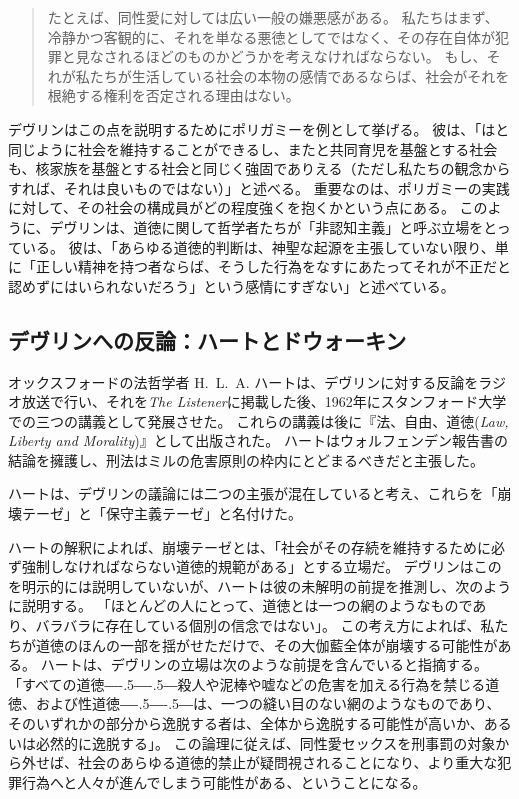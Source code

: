 \documentclass[paper=a4,book,openany]{jlreq}
\newcommand{\ig}[1]{}           %
\def\DDASH{―\kern-.5\zw―\kern-.5\zw―}
\begin{document}
\begin{quote}
たとえば、同性愛に対しては広い一般の嫌悪感がある。
私たちはまず、冷静かつ客観的に、それを単なる悪徳としてではなく、その存在自体が犯罪と見なされるほどのものかどうかを考えなければならない。
もし、それが私たちが生活している社会の本物の感情であるならば、社会がそれを根絶する権利を否定される理由はない\citep[p.40]{devlin65:_enfor_moral}。
\end{quote}

デヴリン\ig{Patrick Devlin}はこの点を説明するためにポリガミーを例として挙げる。
彼は、「はと同じように社会を維持することができるし、またと共同育児を基盤とする社会も、核家族を基盤とする社会と同じく強固でありえる（ただし私たちの観念からすれば、それは良いものではない）」と述べる\citep[p.114]{devlin65:_enfor_moral}。
重要なのは、ポリガミーの実践に対して、その社会の構成員がどの程度強くを抱くかという点にある。
このように、デヴリン\ig{Patrick Devlin}は、道徳に関して哲学者たちが「非認知主義」と呼ぶ立場をとっている。
彼は、「あらゆる道徳的判断は、神聖な起源を主張していない限り、単に「正しい精神を持つ者ならば、そうした行為をなすにあたってそれが不正だと認めずにはいられないだろう」という感情にすぎない」と述べている\citep[p.17]{devlin65:_enfor_moral}。

\subsection{デヴリンへの反論：ハートとドウォーキン}

オックスフォードの法哲学者 H.~L.~A. ハートは、デヴリン\ig{Patrick Devlin}に対する反論をラジオ放送で行い、それを\emph{The Listener}に掲載した後、1962年にスタンフォード大学での三つの講義として発展させた。
これらの講義は後に『法、自由、道徳(\emph{Law, Liberty and Morality})』として出版された。
ハートはウォルフェンデン報告書の結論を擁護し、刑法はミルの危害原則の枠内にとどまるべきだと主張した。

ハートは、デヴリン\ig{Patrick Devlin}の議論には二つの主張が混在していると考え、これらを「崩壊テーゼ」と「保守主義テーゼ」と名付けた\citep[p.115]{hart63:_law_liber_and_moral}。

ハートの解釈によれば、崩壊テーゼとは、「社会がその存続を維持するために必ず強制しなければならない道徳的規範がある」とする立場だ。
デヴリン\ig{Patrick Devlin}はこのを明示的には説明していないが、ハートは彼の未解明の前提を推測し、次のように説明する。
「ほとんどの人にとって、道徳とは一つの網のようなものであり、バラバラに存在している個別の信念ではない」\citep[pp. 50--51]{hart63:_law_liber_and_moral}。
この考え方によれば、私たちが道徳のほんの一部を揺がせただけで、その大伽藍全体が崩壊する可能性がある。
ハートは、デヴリン\ig{Patrick Devlin}の立場は次のような前提を含んでいると指摘する。
「すべての道徳{\DDASH}殺人や泥棒や嘘などの危害を加える行為を禁じる道徳、および性道徳{\DDASH}は、一つの縫い目のない網のようなものであり、そのいずれかの部分から逸脱する者は、全体から逸脱する可能性が高いか、あるいは必然的に逸脱する」\citep[p.50]{hart63:_law_liber_and_moral}。
この論理に従えば、同性愛セックスを刑事罰の対象から外せば、社会のあらゆる道徳的禁止が疑問視されることになり、より重大な犯罪行為へと人々が進んでしまう可能性がある、ということになる。
\end{document}
